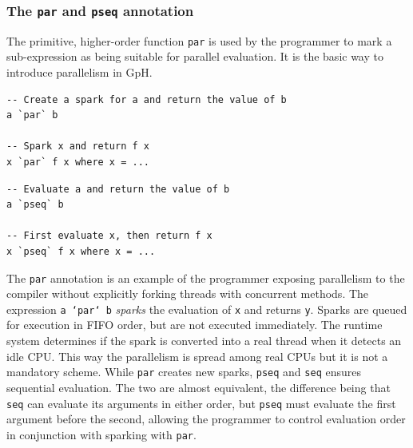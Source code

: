 \documentclass[CS4204-Notes.tex]{subfiles}
\begin{document}
\subsubsection{The \texttt{par} and \texttt{pseq} annotation}
The primitive, higher-order function \texttt{par} is used by the programmer to mark a sub-expression as being suitable for parallel evaluation. It is the basic way to introduce parallelism in GpH.
\begin{lstlisting}[caption={Example of the \texttt{par} annotation.}]
-- Create a spark for a and return the value of b
a `par` b

-- Spark x and return f x
x `par` f x where x = ...
\end{lstlisting}
\begin{lstlisting}[caption={Example of the \texttt{pseq} annotation.}]
-- Evaluate a and return the value of b
a `pseq` b

-- First evaluate x, then return f x
x `pseq` f x where x = ...
\end{lstlisting}
The \texttt{par} annotation is an example of the programmer exposing parallelism to the compiler without explicitly forking threads with concurrent methods. The expression \texttt{a `par` b} \textit{sparks} the evaluation of \texttt{x} and returns \texttt{y}. Sparks are queued for execution in FIFO order, but are not executed immediately. The runtime system determines if the spark is converted into a real thread when it detects an idle CPU. This way the parallelism is spread among real CPUs but it is not a mandatory scheme. 
\n
While \texttt{par} creates new sparks, \texttt{pseq} and \texttt{seq} ensures sequential evaluation. The two are almost equivalent, the difference being that \texttt{seq} can evaluate its arguments in either order, but \texttt{pseq} must evaluate the first argument before the second, allowing the programmer to control evaluation order in conjunction with sparking with \texttt{par}.
\end{document}
